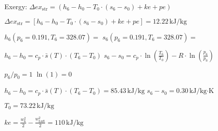 Exergy:  
\( \Delta ex_{\text{str}} = (h_6 - h_0 - T_0 \cdot (s_6 - s_0) + ke + pe) \)  

\( \Delta ex_{\text{str}} = [h_6 - h_0 - T_0 \cdot (s_6 - s_0) + ke + pe] = 12.22 \, \text{kJ/kg} \)  

\( h_6 (p_6 = 0.191, T_6 = 328.07) = \)  
\( s_6 (p_6 = 0.191, T_6 = 328.07) = \)  

\( h_6 - h_0 = c_p \cdot \bar{s}(T) \cdot (T_6 - T_0) \)  
\( s_6 - s_0 = c_p \cdot \ln\left(\frac{T_6}{T_0}\right) - R \cdot \ln\left(\frac{p_6}{p_0}\right) \)  

\( p_6 / p_0 = 1 \)  
\( \ln(1) = 0 \)  

\( h_6 - h_0 = c_p \cdot \bar{s}(T) \cdot (T_6 - T_0) = 85.43 \, \text{kJ/kg} \)  
\( s_6 - s_0 = 0.30 \, \text{kJ/kg·K} \)  

\( T_0 = 73.22 \, \text{kJ/kg} \)  

\( ke = \frac{w_6^2}{2} - \frac{w_{\text{Luft}}^2}{2} = 110 \, \text{kJ/kg} \)